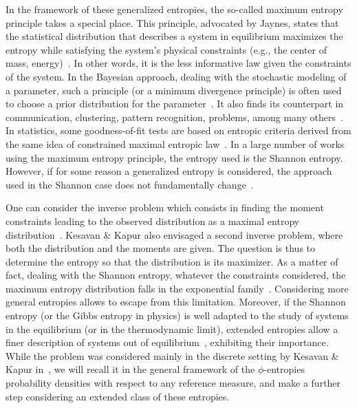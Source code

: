 \documentclass[entropy,article,submit,moreauthors,pdftex]{Definitions/mdpi}
\begin{document}
In the framework  of these generalized entropies, the  so-called maximum entropy
principle takes  a special place.   This principle, advocated by  Jaynes, states
that  the  statistical  distribution  that describes  a  system  in  equilibrium
maximizes the entropy while satisfying  the system's physical constraints (e.g.,
the center  of mass,  energy)~\cite{Jay57, Kap89,  Arn01, CovTho06,  Gok75}.  In
other  words, it  is  the less  informative  law given  the  constraints of  the
system. In  the Bayesian  approach, dealing  with the  stochastic modeling  of a
parameter, such a principle (or a minimum divergence principle) is often used to
choose  a  prior  distribution  for  the  parameter~\cite{Jay68,  Csi91,  Bas13,
  FriSri08, Rob07}. It also finds  its counterpart in communication, clustering,
pattern recognition,  problems, among many others~\cite{Kap89,  Jay82, JonByr90,
  Arn01,  HerMa02, ParBer09}.   In  statistics, some  goodness-of-fit tests  are
based on  entropic criteria derived  from the  same idea of  constrained maximal
entropic law~\cite{Vas76,  Gok83, Son02,  Leq14, Leq15,  GirReg15}.  In  a large
number of  works using the  maximum entropy principle,  the entropy used  is the
Shannon  entropy.   However,  if  for  some  reason  a  generalized  entropy  is
considered,  the  approach used  in  the  Shannon  case does  not  fundamentally
change~\cite{KesKap89, BorLew91:03, BorLew91:05, BorLew93}.

One  can consider  the  inverse problem  which consists  in  finding the  moment
constraints  leading  to   the  observed  distribution  as   a  maximal  entropy
distribution~\cite{KesKap89}.  Kesavan \& Kapur  also envisaged a second inverse
problem, where both the distribution and the moments are given.  The question is
thus to determine  the entropy so that  the distribution is its  maximizer. As a
matter  of fact,  dealing with  the  Shannon entropy,  whatever the  constraints
considered,  the   maximum  entropy   distribution  falls  in   the  exponential
family~\cite{CovTho06, BorLew91:05, Arn01,  MezMon09}.  Considering more general
entropies  allows to  escape from  this  limitation.  Moreover,  if the  Shannon
entropy  (or the  Gibbs entropy  in physics)  is well  adapted to  the study  of
systems in the  equilibrium (or in the thermodynamic  limit), extended entropies
allow a finer  description of systems out  of equilibrium~\cite{Tsa88, TsaMen98,
  Tsa99,  Tsa09, EssSch00,  ParBir05}, exhibiting  their importance.   While the
problem  was considered  mainly  in the  discrete setting  by  Kesavan \&  Kapur
in~\cite{KesKap89},  we  will  recall  it   in  the  general  framework  of  the
$\phi$-entropies probability  densities with  respect to any  reference measure,
and make a further step considering an extended class of these entropies.
\end{document}
